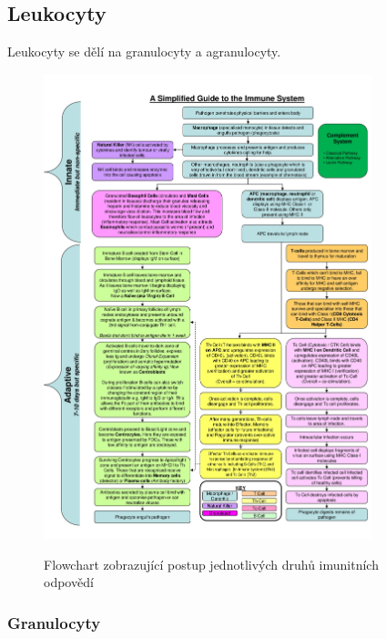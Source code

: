 \documentclass[DIV=8]{scrreprt}
\begin{document}
\subsection{Leukocyty} \label{Leukocyty}


Leukocyty se dělí na granulocyty a agranulocyty.

\begin{figure}
    \caption{Flowchart zobrazující postup jednotlivých druhů imunitních odpovědí}
    \includegraphics[width=0.85\textwidth]{imunita.jpg}
    \centering
    \label{}
\end{figure}


\subsubsection{Granulocyty} \label{Granulocyty}
\end{document}
